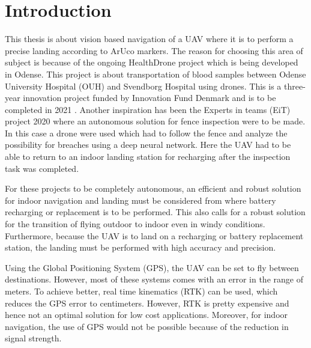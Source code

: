 \documentclass[../Head/report.tex]{subfiles}
\begin{document}
\section{Introduction}

This thesis is about vision based navigation of a UAV where it is to perform a precise landing according to ArUco markers. The reason for choosing this area of subject is because of the ongoing HealthDrone project which is being developed in Odense. This project is about transportation of blood samples between Odense University Hospital (OUH) and Svendborg Hospital using drones. This is a three-year innovation project funded by Innovation Fund Denmark and is to be completed in 2021 \cite{HealthDrone}. Another inspiration has been the Experts in teams (EiT) project 2020 \cite{eit} where an autonomous solution for fence inspection were to be made. In this case a drone were used which had to follow the fence and analyze the possibility for breaches using a deep neural network. Here the UAV had to be able to return to an indoor landing station for recharging after the inspection task was completed.     

For these projects to be completely autonomous, an efficient and robust solution for indoor navigation and landing must be considered from where battery recharging or replacement is to be performed. This also calls for a robust solution for the transition of flying outdoor to indoor even in windy conditions. Furthermore, because the UAV is to land on a recharging or battery replacement station, the landing must be performed with high accuracy and precision.

Using the Global Positioning System (GPS), the UAV can be set to fly between destinations. However, most of these systems comes with an error in the range of meters. To achieve better, real time kinematics (RTK) can be used, which reduces the GPS error to centimeters. However, RTK is pretty expensive and hence not an optimal solution for low cost applications. Moreover, for indoor navigation, the use of GPS would not be possible because of the reduction in signal strength. 
\end{document}

